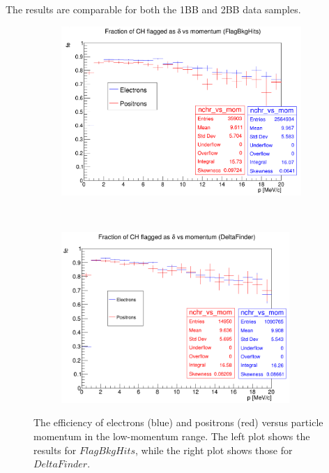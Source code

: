 The results are comparable for both the 1BB and 2BB data samples.


    \begin{figure}[!h]
        \centering
        \begin{subfigure}[t]{0.5\textwidth}
            \centering
            \includegraphics[width=1.\textwidth]{figures/png/Screenshot_20240818_155835.png}
            \caption{}
        \end{subfigure}%
        ~ 
        \begin{subfigure}[t]{0.5\textwidth}
            \centering
            \includegraphics[width=0.95\textwidth]{figures/png/Screenshot_20240813_203916.png}
            \caption{}
        \end{subfigure}
        \caption[The efficiency of electrons and positrons versus 
        particle momentum in the low-momentum range.]{The efficiency of electrons (blue) and positrons (red) versus 
        particle momentum in the low-momentum range. The left plot shows the 
        results for $FlagBkgHits$, while the right plot shows those for $DeltaFinder$.
        }
        \label{fig:efficiency}
      \end{figure} 

